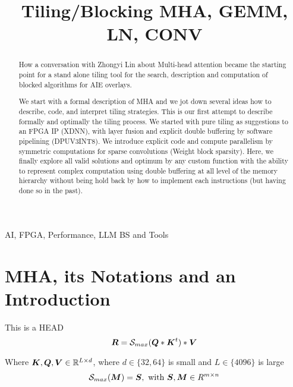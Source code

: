 \documentclass[conference]{IEEEtran}
\begin{document}
\title{Tiling/Blocking MHA, GEMM, LN, CONV }

\author{
}

\maketitle

\begin{abstract}
  How a conversation with Zhongyi Lin about Multi-head attention
  became the starting point for a stand alone tiling tool for the
  search, description and computation of blocked algorithms for AIE
  overlays.

  We start with a formal description of MHA and we jot down several
  ideas how to describe, code, and interpret tiling strategies. This
  is our first attempt to describe formally and optimally the tiling
  process. We started with pure tiling as suggestions to an FPGA IP
  (XDNN), with layer fusion and explicit double buffering by software
  pipelining (DPUV3INT8). We introduce explicit code and compute
  parallelism by symmetric computations for sparse convolutions
  (Weight block sparsity). Here, we finally explore all valid
  solutions and optimum by any custom function with the ability to
  represent complex computation using double buffering at all level of
  the memory hierarchy without being hold back by how to implement
  each instructions (but having done so in the past).
  


  
\end{abstract}


\begin{IEEEkeywords}
 AI, FPGA, Performance, LLM BS and Tools
\end{IEEEkeywords}

\section{MHA, its Notations and an Introduction}
\label{sec:introduction}
This is a HEAD
\begin{equation}
  \Vc{R} = \Smax{\Vc{Q}*\Vc{K}^t}*\Vc{V}
\end{equation}

Where ${\boldsymbol K},{\boldsymbol Q},{\boldsymbol V} \in \mathbb{R} ^{L\times d}$, where $d\in\{32,64\}$ is small and $L \in \{4096\}$
is large
\begin{equation}
  \Smax{\Vc{M}}  = \Vc{S}, \text{ with } \Vc{S}, \Vc{M} \in R^{m\times n} \\
\end{equation}
\end{document}
